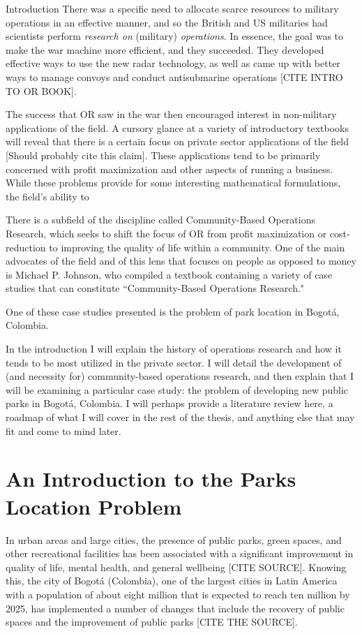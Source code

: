 \documentclass[12pt]{pom_thesis}
\theoremstyle{definition}
\begin{document}
\begin{chapter}{Introduction}
	There was a specific need to allocate scarce resources to military operations in an effective manner, and so the British and US militaries had scientists perform \textit{research on} (military) \textit{operations}. In essence, the goal was to make the war machine more efficient, and they succeeded. They developed effective ways to use the new radar technology, as well as came up with better ways to manage convoys and conduct antisubmarine operations [CITE INTRO TO OR BOOK]. 
	
	The success that OR saw in the war then encouraged interest in non-military applications of the field.
	A cursory glance at a variety of introductory textbooks will reveal that there is a certain focus on private sector applications of the field [Should probably cite this claim]. These applications tend to be primarily concerned with profit maximization and other aspects of running a business. While these problems provide for some interesting mathematical formulations, the field's ability to 
	
	There is a subfield of the discipline called Community-Based Operations Research, which seeks to shift the focus of OR from profit maximization or cost-reduction to improving the quality of life within a community. One of the main advocates of the field and of this lens that focuses on people as opposed to money is Michael P. Johnson, who compiled a textbook containing a variety of case studies that can constitute ``Community-Based Operations Research." 
	
	One of these case studies presented is the problem of park location in Bogot\'{a}, Colombia.

In the introduction I will explain the history of operations research and how it tends to be most utilized in the private sector. I will detail the development of (and necessity for) community-based operations research, and then explain that I will be examining a particular case study: the problem of developing new public parks in Bogot\'a, Colombia. I will perhaps provide a literature review here, a roadmap of what I will cover in the rest of the thesis, and anything else that may fit and come to mind later.

\section{An Introduction to the Parks Location Problem} \label{intro-parks-problem}

	In urban areas and large cities, the presence of public parks, green spaces, and other recreational facilities has been associated with a significant improvement in quality of life, mental health, and general wellbeing [CITE SOURCE]. Knowing this, the city of Bogot\'{a} (Colombia), one of the largest cities in Latin America with a population of about eight million that is expected to reach ten million by 2025, has implemented a number of changes that include the recovery of public spaces and the improvement of public parks [CITE THE SOURCE]. 
	

\end{chapter}
\end{document}
